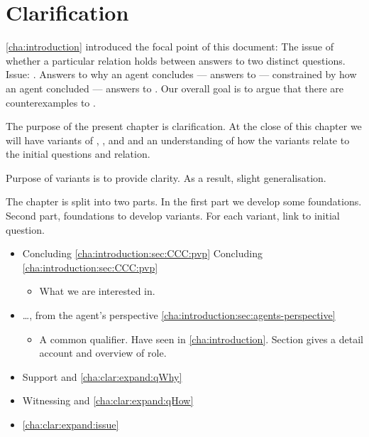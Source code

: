 \chapter{Clarification}
\label{cha:clarification}

\begin{note}
  \autoref{cha:introduction} introduced the focal point of this document:
  The issue of whether a particular relation holds between answers to two distinct questions.
  Issue: \issueInclusion{}.
  Answers to why an agent concludes  --- answers to \qWhy{} --- constrained by how an agent concluded --- answers to \qHow{}.
  Our overall goal is to argue that there are counterexamples to \issueInclusion{}.

  The purpose of the present chapter is clarification.
  At the close of this chapter we will have variants of \qWhy{}, \qHow{}, and \issueInclusion{} and an understanding of how the variants relate to the initial questions and relation.

  Purpose of variants is to provide clarity.
  As a result, slight generalisation.
\end{note}

\begin{note}
  The chapter is split into two parts.
  In the first part we develop some foundations.
  Second part, foundations to develop variants.
  For each variant, link to initial question.

  \begin{itemize}
  \item
    Concluding \hfill \autoref{cha:introduction:sec:CCC:pvp}    Concluding \hfill \autoref{cha:introduction:sec:CCC:pvp}
    \begin{itemize}
    \item
      What we are interested in.
    \end{itemize}
  \item
    \dots, from the agent's perspective \hfill \autoref{cha:introduction:sec:agents-perspective}
    \begin{itemize}
    \item
      A common qualifier.
      Have seen in \autoref{cha:introduction}.
      Section gives a detail account and overview of role.
    \end{itemize}
  \end{itemize}

  \begin{itemize}
  \item
    Support and \qWhy{} \hfill \autoref{cha:clar:expand:qWhy}
  \item
    Witnessing and \qHow{} \hfill \autoref{cha:clar:expand:qHow}
  \item
    \issueInclusion{} \hfill \autoref{cha:clar:expand:issue}
  \end{itemize}
\end{note}

